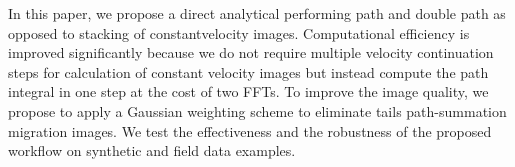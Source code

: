 In this paper, we propose a direct analytical  performing path and double
path  as opposed to 
stacking of  constant\new{-}velocity images. Computational efficiency is improved significantly because
we do not require multiple velocity continuation steps for calculation of constant velocity images but instead compute
the path integral in one step at the cost of  two  \new{(}FFTs\new{)}.
To improve the image quality, we propose to apply a Gaussian weighting scheme to eliminate tails  path-summation migration images.
We test the effectiveness and the robustness of the proposed workflow 
on synthetic and field data examples.  


